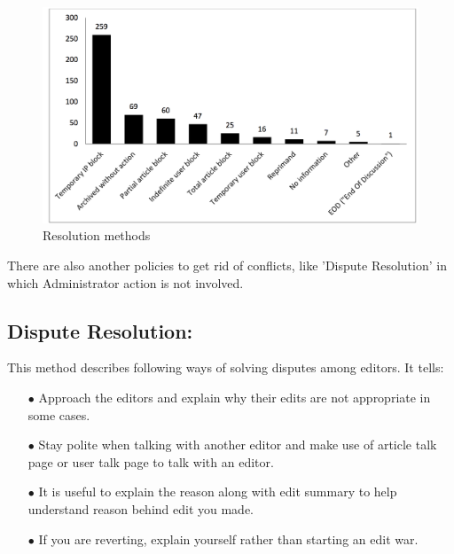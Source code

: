 \documentclass[12pt]{article}
\begin{document}
\begin{figure}[h]
\centering
\includegraphics[scale=0.4]{resolutions.png}
\caption{Resolution methods\cite{main}}
\label{resolutions}
\end{figure} 
There are also another policies to get rid of conflicts, like 'Dispute Resolution' in which Administrator action is not involved.
\subsection*{Dispute Resolution:}This method describes following ways of solving disputes among editors\cite{dispute}. It tells:
\begin{itemize}
\item[$\bullet$ ]Approach the editors and explain why their edits are not appropriate in some cases.
\item[$\bullet$ ]Stay polite when talking with another editor and make use of article talk page or user talk page to talk with an editor.
\item[$\bullet$ ]It is useful to explain the reason along with edit summary to help understand reason behind edit you made. 
\item[$\bullet$ ]If you are reverting, explain yourself rather than starting an edit war.
\end{itemize}
\end{document}
